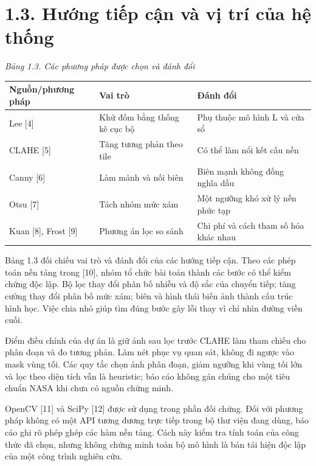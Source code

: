 \documentclass[13pt,a4paper]{extreport}
\begin{document}
\section*{1.3. Hướng tiếp cận và vị trí của hệ thống}
\noindent\textit{Bảng 1.3. Các phương pháp được chọn và đánh đổi}
\begin{longtable}{p{4.87cm}|p{4.87cm}|p{4.87cm}}
Nguồn/phương pháp & Vai trò & Đánh đổi\\\hline
Lee [4] & Khử đốm bằng thống kê cục bộ & Phụ thuộc mô hình L và cửa sổ\\\hline
CLAHE [5] & Tăng tương phản theo tile & Có thể làm nổi kết cấu nền\\\hline
Canny [6] & Làm mảnh và nối biên & Biên mạnh không đồng nghĩa dầu\\\hline
Otsu [7] & Tách nhóm mức xám & Một ngưỡng khó xử lý nền phức tạp\\\hline
Kuan [8], Frost [9] & Phương án lọc so sánh & Chi phí và cách tham số hóa khác nhau\\\hline
\end{longtable}
Bảng 1.3 đối chiếu vai trò và đánh đổi của các hướng tiếp cận. Theo các phép toán nền tảng trong [10], nhóm tổ chức bài toán thành các bước có thể kiểm chứng độc lập. Bộ lọc thay đổi phân bố nhiễu và độ sắc của chuyển tiếp; tăng cường thay đổi phân bố mức xám; biên và hình thái biến ảnh thành cấu trúc hình học. Việc chia nhỏ giúp tìm đúng bước gây lỗi thay vì chỉ nhìn đường viền cuối.
\par
Điểm điều chỉnh của dự án là giữ ảnh sau lọc trước CLAHE làm tham chiếu cho phân đoạn và đo tương phản. Làm nét phục vụ quan sát, không đi ngược vào mask vùng tối. Các quy tắc chọn ảnh phân đoạn, giảm ngưỡng khi vùng tối lớn và lọc theo diện tích vẫn là heuristic; báo cáo không gán chúng cho một tiêu chuẩn NASA khi chưa có nguồn chứng minh.
\par
OpenCV [11] và SciPy [12] được sử dụng trong phần đối chứng. Đối với phương pháp không có một API tương đương trực tiếp trong bộ thư viện đang dùng, báo cáo ghi rõ phép ghép các hàm nền tảng. Cách này kiểm tra tính toán của công thức đã chọn, nhưng không chứng minh toàn bộ mô hình là bản tái hiện độc lập của một công trình nghiên cứu.
\par
\clearpage
\end{document}
